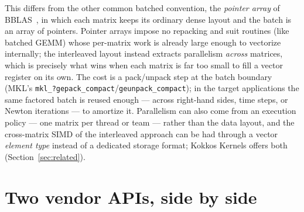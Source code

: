 \documentclass[11pt]{article}
\newcommand{\code}[1]{\texttt{#1}}
\begin{document}
This differs from the other common batched convention, the \emph{pointer array}
of BBLAS~\cite{bblas2021}, in which each matrix keeps its ordinary dense layout
and the batch is an array of pointers. Pointer arrays impose no repacking and
suit routines (like batched GEMM) whose per-matrix work is already large enough
to vectorize internally; the interleaved layout instead extracts parallelism
\emph{across} matrices, which is precisely what wins when each matrix is far too
small to fill a vector register on its own. The cost is a pack/unpack step at
the batch boundary (MKL's \code{mkl\_?gepack\_compact}/\code{geunpack\_compact});
in the target applications the same factored batch is reused enough --- across
right-hand sides, time steps, or Newton iterations --- to amortize it. Parallelism
can also come from an execution policy --- one matrix per thread or team --- rather
than the data layout, and the cross-matrix SIMD of the interleaved approach can be
had through a vector \emph{element type} instead of a dedicated storage format;
Kokkos Kernels offers both (Section~\ref{sec:related}).

\section{Two vendor APIs, side by side}
\label{sec:vendors}
\end{document}
